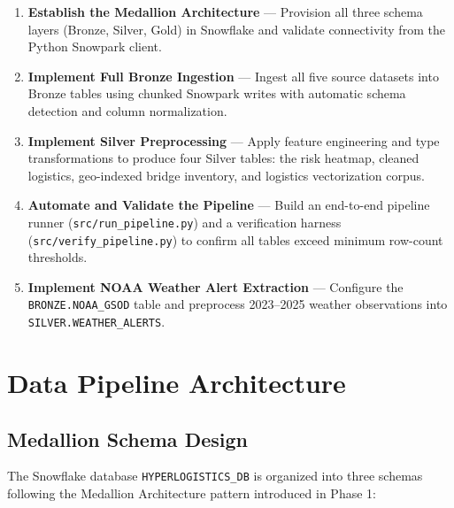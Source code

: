 \documentclass[14.5pt,letterpaper]{article}
\begin{document}
\begin{enumerate}[leftmargin=*]
    \item \textbf{Establish the Medallion Architecture} --- Provision all three schema layers (Bronze, Silver, Gold) in Snowflake and validate connectivity from the Python Snowpark client.

    \item \textbf{Implement Full Bronze Ingestion} --- Ingest all five source datasets into Bronze tables using chunked Snowpark writes with automatic schema detection and column normalization.

    \item \textbf{Implement Silver Preprocessing} --- Apply feature engineering and type transformations to produce four Silver tables: the risk heatmap, cleaned logistics, geo-indexed bridge inventory, and logistics vectorization corpus.

    \item \textbf{Automate and Validate the Pipeline} --- Build an end-to-end pipeline runner (\texttt{src/run\_pipeline.py}) and a verification harness (\texttt{src/verify\_pipeline.py}) to confirm all tables exceed minimum row-count thresholds.

    \item \textbf{Implement NOAA Weather Alert Extraction} --- Configure the \texttt{BRONZE.NOAA\_GSOD} table and preprocess 2023--2025 weather observations into \texttt{SILVER.WEATHER\_ALERTS}.
\end{enumerate}

\section{Data Pipeline Architecture}

\subsection{Medallion Schema Design}

The Snowflake database \texttt{HYPERLOGISTICS\_DB} is organized into three schemas following the Medallion Architecture pattern introduced in Phase 1:
\end{document}
